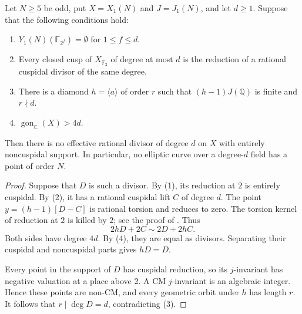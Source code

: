 \begin{lemma}\label{lem:dyadic-cuspidal-diamond}
Let $N\geq5$ be odd, put $X=X_1(N)$ and $J=J_1(N)$, and let
$d\geq1$. Suppose that the following conditions hold:
\begin{enumerate}
\item $Y_1(N)(\mathbb F_{2^f})=\emptyset$ for $1\leq f\leq d$.
\item Every closed cusp of $X_{\mathbb F_2}$ of degree at most $d$
is the reduction of a rational cuspidal divisor of the same degree.
\item There is a diamond $h=\langle a\rangle$ of order $r$ such that
$(h-1)J(\mathbb Q)$ is finite and $r\nmid d$.
\item $\operatorname{gon}_{\mathbb C}(X)>4d$.
\end{enumerate}
Then there is no effective rational divisor of degree $d$ on $X$
with entirely noncuspidal support. In particular, no elliptic curve
over a degree-$d$ field has a point of order $N$.
\end{lemma}
\begin{proof}
Suppose that $D$ is such a divisor.
By (1), its reduction at $2$ is entirely cuspidal.
By (2), it has a rational cuspidal lift $C$ of degree $d$.
The point $y=(h-1)[D-C]$ is rational torsion and reduces to zero.
The torsion kernel of reduction at $2$ is killed by $2$; see the
proof of \cite[Proposition~3.4]{DKSS}.
Thus
\[
 2hD+2C\sim2D+2hC.
\]
Both sides have degree $4d$.
By (4), they are equal as divisors.
Separating their cuspidal and noncuspidal parts gives $hD=D$.

Every point in the support of $D$ has cuspidal reduction, so its
$j$-invariant has negative valuation at a place above $2$.
A CM $j$-invariant is an algebraic integer. Hence these points are
non-CM, and every geometric orbit under $h$ has length $r$.
It follows that $r\mid\deg D=d$, contradicting (3).
\end{proof}
